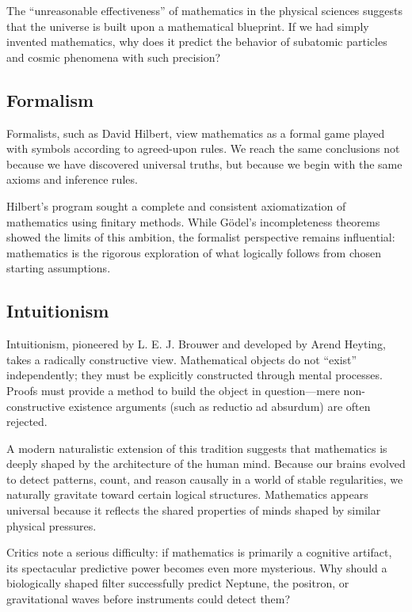The ``unreasonable effectiveness'' of mathematics in the physical sciences suggests that the universe is built upon a mathematical blueprint.
If we had simply invented mathematics, why does it predict the behavior of subatomic particles and cosmic phenomena with such precision?

\subsection*{Formalism}

Formalists, such as David Hilbert, view mathematics as a formal game played with symbols according to agreed-upon rules.
We reach the same conclusions not because we have discovered universal truths, but because we begin with the same axioms and inference rules.

Hilbert's program sought a complete and consistent axiomatization of mathematics using finitary methods.
While Gödel's incompleteness theorems showed the limits of this ambition, the formalist perspective remains influential:
mathematics is the rigorous exploration of what logically follows from chosen starting assumptions.

\subsection*{Intuitionism}

Intuitionism, pioneered by L. E. J. Brouwer and developed by Arend Heyting, takes a radically constructive view.
Mathematical objects do not ``exist'' independently; they must be explicitly constructed through mental processes.
Proofs must provide a method to build the object in question---mere non-constructive existence arguments (such as reductio ad absurdum) are often rejected.

A modern naturalistic extension of this tradition suggests that mathematics is deeply shaped by the architecture of the human mind.
Because our brains evolved to detect patterns, count, and reason causally in a world of stable regularities, we naturally gravitate toward certain logical structures.
Mathematics appears universal because it reflects the shared properties of minds shaped by similar physical pressures.

Critics note a serious difficulty: if mathematics is primarily a cognitive artifact, its spectacular predictive power becomes even more mysterious.
Why should a biologically shaped filter successfully predict Neptune, the positron, or gravitational waves before instruments could detect them?

